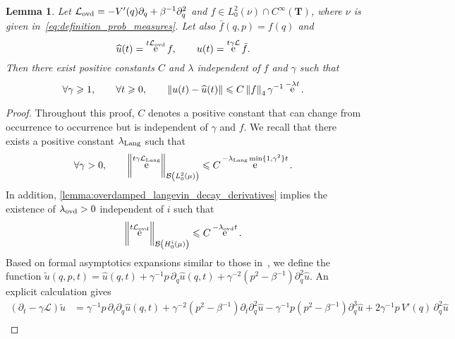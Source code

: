\documentclass[11pt,a4paper]{article}
\DeclareMathOperator{\e}{e}
\newcommand{\torus}{\mathbf T}
\theoremstyle{plain}
\newtheorem{lemma}{Lemma}[section]
\numberwithin{equation}{section}
\renewcommand{\leq}{\leqslant}
\renewcommand{\geq}{\geqslant}
\begin{document}
\begin{lemma}
    \label{lemma:backward_kolmogorov_obs_q}
    Let $\mathcal L_{\rm ovd} = - V'(q) \partial_q + \beta^{-1} \partial_q^2$ and $f \in L^2_0(\nu) \cap C^{\infty}(\torus)$,
    where $\nu$ is given in~\eqref{eq:definition_prob_measures}.
    Let also $\bar f(q, p) = f(q)$ and
    \[
        \widehat u(t) = \e^{t\mathcal L_{\rm ovd}} f, \qquad
        u(t) = \e^{t \gamma\mathcal L} \bar f.
    \]
    Then there exist positive constants $C$ and $\lambda$ independent of $f$ and $\gamma$ such that
    \[
        \forall \gamma \geq 1, \qquad
        \forall t \geq 0, \qquad
        \norm{u(t)  - \widehat u(t)} \leq
        C \norm{f}_4 \gamma^{-1} \e^{-\lambda t}.
    \]
\end{lemma}
\begin{proof}
    Throughout this proof, $C$ denotes a positive constant that can change from occurrence to occurrence but is independent of $\gamma$ and $f$.
    We recall that there exists a positive constant $\lambda_{\rm Lang}$ such that~\cite{roussel2018spectral,pavliotis2011applied}
    \begin{equation}
        \label{eq:decay_langevin}
        \forall \gamma > 0, \qquad
        \norm{\e^{t \gamma \mathcal L_{\rm Lang}}}[\mathcal B\left(L^2_0(\mu)\right)] \leq C \e^{- \lambda_{\rm Lang} \min\{1,\gamma^2\} t}.
    \end{equation}
    In addition, \cref{lemma:overdamped_langevin_decay_derivatives} implies the existence of $\lambda_{\rm ovd} > 0$ independent of $i$ such that
    \begin{equation}
        \label{eq:decay_ovd}
        \norm{\e^{t \mathcal L_{\rm ovd}}}[\mathcal B\left(H^i_0(\mu)\right)] \leq C \e^{- \lambda_{\rm ovd} t}.
    \end{equation}
    Based on formal asymptotics expansions similar to those in~\cite[Chapter 6]{pavliotis2011applied},
    we define the function
    \(
        \widetilde u(q, p, t) =
        \widehat u(q, t)
        + \gamma^{-1} p \, \partial_q \widehat u(q, t)
        + \gamma^{-2} (p^2 - \beta^{-1}) \partial_q^{2} \widehat u.
    \)
    An explicit calculation gives
    \begin{align*}
        (\partial_t - \gamma \mathcal L) \widetilde u
        &= \gamma^{-1} p \, \partial_t \partial_q \widehat u(q, t) + \gamma^{-2} (p^2 - \beta^{-1}) \partial_t \partial_q^{2} \widehat u
        - \gamma^{-1} p (p^2 - \beta^{-1}) \partial_q^{3} \widehat u + 2 \gamma^{-1} p \, V'(q) \, \partial_q^2 \widehat u \\

\end{align*}
\end{proof}
\end{document}
